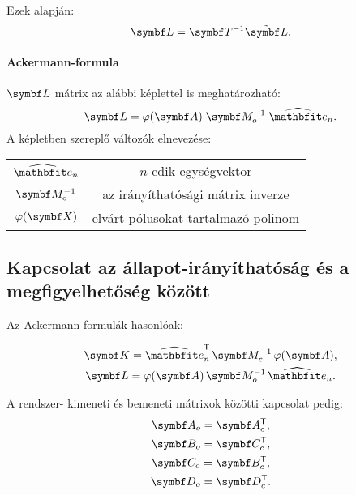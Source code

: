 Ezek alapján:
\begin{equation}
  \rmat L = \rmat T^{-1} \tmat L.
\end{equation}

\paragraph{Ackermann-formula}

$\rmat L$ mátrix az alábbi képlettel is meghatározható:
\begin{equation}
  \rmat L
  = \varphi(\rmat A)
  \;\rmat M_o^{-1}
  \;\uvec e_n
  .
\end{equation}
A képletben szereplő változók elnevezése:
\bgroup
\def\arraystretch{1.2}
\begin{center}
  \begin{tabular}{ | c c | }
    \hline
    $\uvec e_n$        & $n$-edik egységvektor               \\
    $\rmat M_c^{-1}$   & az irányíthatósági mátrix inverze   \\
    $\varphi(\rmat X)$ & elvárt pólusokat tartalmazó polinom \\
    \hline
  \end{tabular}
\end{center}
\egroup

\subsection{Kapcsolat az állapot-irányíthatóság és a megfigyelhetőség között}

Az Ackermann-formulák hasonlóak:

\begin{gather}
  \rmat K
  = \uvec e^\T_n
  \,\rmat M_c^{-1}
  \,\varphi(\rmat A)
  ,
  \\
  \rmat L
  = \varphi(\rmat A)
  \,\rmat M_o^{-1}
  \,\uvec e_n
  .
\end{gather}

A rendszer- kimeneti és bemeneti mátrixok közötti kapcsolat pedig:
\begin{gather}
  \rmat A_o = \rmat A_c^\T, \\
  \rmat B_o = \rmat C_c^\T, \\
  \rmat C_o = \rmat B_c^\T, \\
  \rmat D_o = \rmat D_c^\T.
\end{gather}

\clearpage
